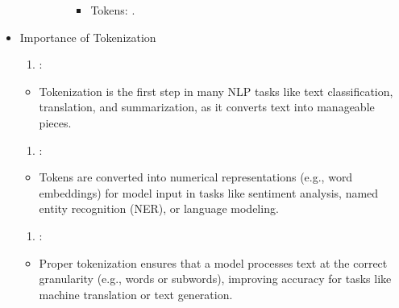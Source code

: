 \documentclass[letterpaper,11pt,english]{sphinxmanual}
\begin{document}
\begin{itemize}
\begin{itemize}
\begin{description}
\begin{itemize}
\item {} 
\sphinxAtStartPar
Tokens: \sphinxcode{\sphinxupquote{{[}"h", "e", "l", "l", "o"{]}}}.

\end{itemize}

\end{description}

\end{itemize}

\item {} 
\sphinxAtStartPar
Importance of Tokenization
\begin{enumerate}
%
\item {} 
\sphinxAtStartPar
{}:

\end{enumerate}
\begin{itemize}
\item {} 
\sphinxAtStartPar
Tokenization is the first step in many NLP tasks like text classification, translation, and
summarization, as it converts text into manageable pieces.

\end{itemize}
\begin{enumerate}
%
\setcounter{enumi}{1}
\item {} 
\sphinxAtStartPar
{}:

\end{enumerate}
\begin{itemize}
\item {} 
\sphinxAtStartPar
Tokens are converted into numerical representations (e.g., word embeddings) for model input
in tasks like sentiment analysis, named entity recognition (NER), or language modeling.

\end{itemize}
\begin{enumerate}
%
\setcounter{enumi}{2}
\item {} 
\sphinxAtStartPar
{}:

\end{enumerate}
\begin{itemize}
\item {} 
\sphinxAtStartPar
Proper tokenization ensures that a model processes text at the correct granularity (e.g.,
words or subwords), improving accuracy for tasks like machine translation or text generation.


\end{itemize}
\end{itemize}
\end{document}
